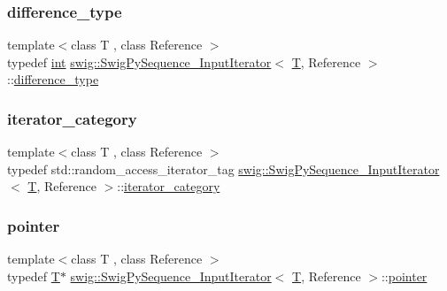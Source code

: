 \subsubsection{\texorpdfstring{difference\+\_\+type}{difference\_type}}
{\footnotesize\ttfamily template$<$class T , class Reference $>$ \\
typedef \hyperlink{lp__lib_8h_adeb9ec6400320e4923ac9d836d509ddb}{int} \hyperlink{structswig_1_1_swig_py_sequence___input_iterator}{swig\+::\+Swig\+Py\+Sequence\+\_\+\+Input\+Iterator}$<$ \hyperlink{fmt_8h_a0acb682b8260ab1c60b918599864e2e5}{T}, Reference $>$\+::\hyperlink{structswig_1_1_swig_py_sequence___input_iterator_af5e5d3f2d1906ceaf05c2215ee388096}{difference\+\_\+type}}

\mbox{\label{structswig_1_1_swig_py_sequence___input_iterator_a39f1b5afee549aeb2f87c854c41be9c1}} 
\subsubsection{\texorpdfstring{iterator\+\_\+category}{iterator\_category}}
{\footnotesize\ttfamily template$<$class T , class Reference $>$ \\
typedef std\+::random\+\_\+access\+\_\+iterator\+\_\+tag \hyperlink{structswig_1_1_swig_py_sequence___input_iterator}{swig\+::\+Swig\+Py\+Sequence\+\_\+\+Input\+Iterator}$<$ \hyperlink{fmt_8h_a0acb682b8260ab1c60b918599864e2e5}{T}, Reference $>$\+::\hyperlink{structswig_1_1_swig_py_sequence___input_iterator_a39f1b5afee549aeb2f87c854c41be9c1}{iterator\+\_\+category}}

\mbox{\label{structswig_1_1_swig_py_sequence___input_iterator_ab026efc65329dff4b7af149da037209b}} 
\subsubsection{\texorpdfstring{pointer}{pointer}}
{\footnotesize\ttfamily template$<$class T , class Reference $>$ \\
typedef \hyperlink{fmt_8h_a0acb682b8260ab1c60b918599864e2e5}{T}$\ast$ \hyperlink{structswig_1_1_swig_py_sequence___input_iterator}{swig\+::\+Swig\+Py\+Sequence\+\_\+\+Input\+Iterator}$<$ \hyperlink{fmt_8h_a0acb682b8260ab1c60b918599864e2e5}{T}, Reference $>$\+::\hyperlink{structswig_1_1_swig_py_sequence___input_iterator_ab026efc65329dff4b7af149da037209b}{pointer}}

